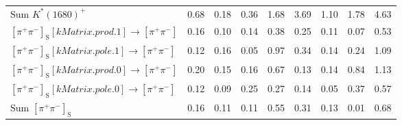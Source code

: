 \begin{tabular}{l  c  c  c  c  c  c  c  | c }
$\text{Sum } K^{*}(1680)^{+}$ & 0.68 & 0.18 & 0.36 & 1.68 & 3.69 & 1.10 & 1.78 & 4.63 \\ 
$\left[\pi^{+}\pi^{-}\right]_{\text{S}}\left[kMatrix.prod.1\right]\rightarrow \left[\pi^{+}\pi^{-}\right]$ & 0.16 & 0.10 & 0.14 & 0.38 & 0.25 & 0.11 & 0.07 & 0.53 \\ 
$\left[\pi^{+}\pi^{-}\right]_{\text{S}}\left[kMatrix.pole.1\right]\rightarrow \left[\pi^{+}\pi^{-}\right]$ & 0.12 & 0.16 & 0.05 & 0.97 & 0.34 & 0.14 & 0.24 & 1.09 \\ 
$\left[\pi^{+}\pi^{-}\right]_{\text{S}}\left[kMatrix.prod.0\right]\rightarrow \left[\pi^{+}\pi^{-}\right]$ & 0.20 & 0.15 & 0.16 & 0.67 & 0.13 & 0.14 & 0.84 & 1.13 \\ 
$\left[\pi^{+}\pi^{-}\right]_{\text{S}}\left[kMatrix.pole.0\right]\rightarrow \left[\pi^{+}\pi^{-}\right]$ & 0.12 & 0.09 & 0.25 & 0.27 & 0.14 & 0.05 & 0.37 & 0.57 \\ 
$\text{Sum } \left[\pi^{+}\pi^{-}\right]_{\text{S}}$ & 0.16 & 0.11 & 0.11 & 0.55 & 0.31 & 0.13 & 0.01 & 0.68 \\ 
\hline
\hline
\end{tabular}
